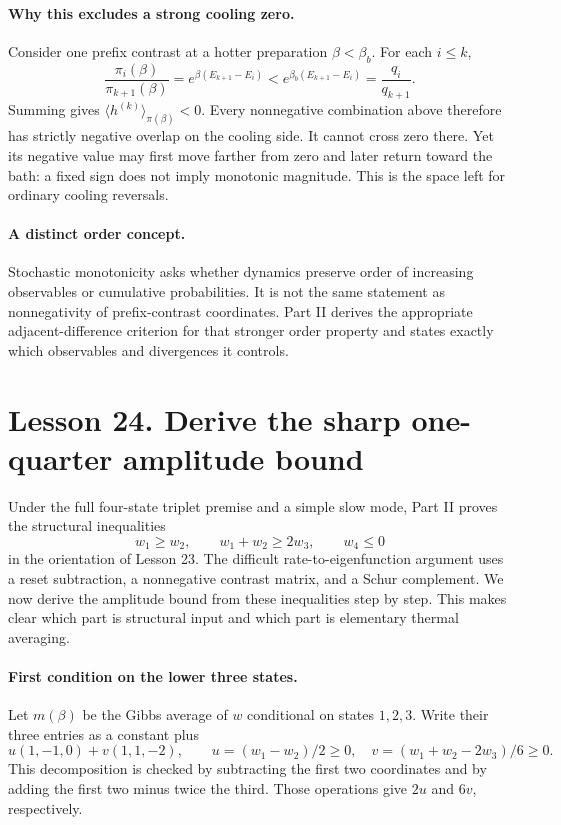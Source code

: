 \documentclass[11pt]{article}
\begin{document}
\paragraph{Why this excludes a strong cooling zero.}
Consider one prefix contrast at a hotter preparation $\beta<\beta_b$.
For each $i\leq k$,
\[
\frac{\pi_i(\beta)}{\pi_{k+1}(\beta)}
=e^{\beta(E_{k+1}-E_i)}
<e^{\beta_b(E_{k+1}-E_i)}=\frac{q_i}{q_{k+1}}.
\]
Summing gives $\langle h^{(k)}\rangle_{\pi(\beta)}<0$.
Every nonnegative combination above therefore has strictly negative
overlap on the cooling side. It cannot cross zero there. Yet its negative
value may first move farther from zero and later return toward the bath:
a fixed sign does not imply monotonic magnitude. This is the space left
for ordinary cooling reversals.

\paragraph{A distinct order concept.}
Stochastic monotonicity asks whether dynamics preserve order of increasing
observables or cumulative probabilities. It is not the same statement as
nonnegativity of prefix-contrast coordinates. Part II derives the
appropriate adjacent-difference criterion for that stronger order property
and states exactly which observables and divergences it controls.

\clearpage
\section*{Lesson 24. Derive the sharp one-quarter amplitude bound}
Under the full four-state triplet premise and a simple slow mode, Part II
proves the structural inequalities
\[
w_1\geq w_2,\qquad w_1+w_2\geq2w_3,\qquad w_4\leq0
\]
in the orientation of Lesson 23. The difficult rate-to-eigenfunction
argument uses a reset subtraction, a nonnegative contrast matrix, and a
Schur complement. We now derive the amplitude bound from these inequalities
step by step. This makes clear which part is structural input and which
part is elementary thermal averaging.

\paragraph{First condition on the lower three states.}
Let $m(\beta)$ be the Gibbs average of $w$ conditional on states $1,2,3$.
Write their three entries as a constant plus
\[
u(1,-1,0)+v(1,1,-2),\qquad
u=(w_1-w_2)/2\geq0,\quad
v=(w_1+w_2-2w_3)/6\geq0.
\]
This decomposition is checked by subtracting the first two coordinates
and by adding the first two minus twice the third. Those operations give
$2u$ and $6v$, respectively.
\end{document}
